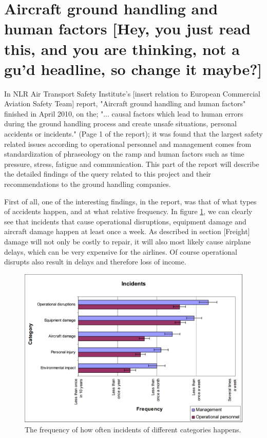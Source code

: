 \section{Aircraft ground handling and human factors [Hey, you just read this, and you are thinking, not a gu'd headline, so change it maybe?]}
In NLR Air Transport Safety Institute's [insert relation to European Commercial Aviation Safety Team] report, "Aircraft ground handling and human factors" finished in April 2010, on the; "... causal factors which lead to human errors during the ground handling process and create unsafe situations, personal accidents or incidents." (Page 1 of the report); it was found that the largest safety related issues according to operational personnel and management comes from standardization of phraseology on the ramp and human factors such as time pressure, stress, fatigue and communication. This part of the report will describe the detailed findings of the query related to this project and their recommendations to the ground handling companies.

First of all, one of the interesting findings, in the report, was that of what types of accidents happen, and at what relative frequency. In figure \ref{FrequencyOfIncidents}, we can clearly see that incidents that cause operational disruptions, equipment damage and aircraft damage happen at least once a week. As described in section [Freight] damage will not only be costly to repair, it will also most likely cause airplane delays, which can be very expensive for the airlines. Of course operational disrupts also result in delays and therefore loss of income.

\begin{figure}[!h]
\centering
\includegraphics[width=\textwidth]{Grafik/FrequencyOfIncidents}
\caption{The frequency of how often incidents of different categories happens.}
\label{FrequencyOfIncidents}
\end{figure}

